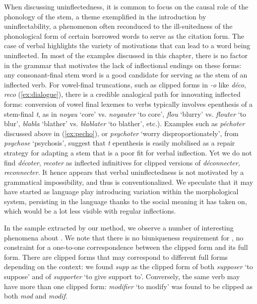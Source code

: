 \documentclass[output=paper,colorlinks,citecolor=brown]{langscibook}
\begin{document}
When discussing uninflectedness, it is common to focus on the causal role of the phonology of the stem, a theme exemplified in the introduction by  uninflectability, a phenomenon often reconduced to the ill-suitedness of the phonological form of certain borrowed words to serve as the citation form. The case of  verbal  highlights the variety of motivations that can lead to a word being uninflected. In most of the examples discussed in this chapter, there is no factor in the grammar that motivates the lack of inflectional endings on these forms: any consonant-final stem word is a good candidate for serving as the stem of an inflected verb. For vowel-final truncations, such as clipped forms in \emph{-o} like \emph{déco}, \emph{reco} (\ref{ex:dialogue}), there is a credible analogical path for innovating inflected forms: conversion of vowel final lexemes to verbs typically involves epenthesis of a stem-final \emph{t}, as in  \emph{noyau}  ‘core’ vs. \emph{noyauter}  ‘to core’, \emph{flou}  ‘blurry’ vs. \emph{flouter}  ‘to blur’, \emph{blabla} ‘blather’ vs. \emph{blablater} ‘to blather’, etc.). Examples such as  \emph{péchoter} discussed above in (\ref{ex:pecho}), or \emph{psychoter} ‘worry disproportionately’, from \emph{psychose} ‘psychosis’, suggest that \emph{t} epenthesis is easily mobilised as a repair strategy for adapting a stem that is a poor fit for verbal inflection. Yet we do not find \emph{décoter}, \emph{recoter} as inflected infinitives for clipped versions of \emph{déconnecter, reconnecter}. It hence appears that  verbal uninflectedness is not motivated  by a grammatical impossibility, and thus is conventionalized. We speculate that it may have started as language play introducing variation within the morphological system, persisting in the language thanks to the social meaning it has taken on, which would be a lot less visible with regular inflections.

In the sample extracted by our method, we observe a number of interesting phenomena about . We note that there is no biuniqueness requirement for , no constraint for a one-to-one correspondence between the clipped form and its full form. There are clipped forms that may correspond to different full forms depending on the context: we found \textit{supp} as the clipped form of both \textit{supposer} `to suppose' and of \textit{supporter} `to give support to'. Conversely, the same verb may have more than one clipped form: \textit{modifier} `to modify' was found to be clipped as both \textit{mod} and \textit{modif}. 
\end{document}
